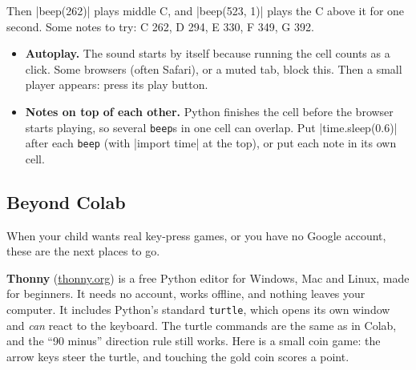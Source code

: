 Then \py|beep(262)| plays middle C, and \py|beep(523, 1)| plays the C above it for one second. Some notes to try: C 262, D 294, E 330, F 349, G 392.

\begin{itemize}
  \item \textbf{Autoplay.} The sound starts by itself because running the cell counts as a click. Some browsers (often Safari), or a muted tab, block this. Then a small player appears: press its play button.
  \item \textbf{Notes on top of each other.} Python finishes the cell before the browser starts playing, so several \texttt{beep}s in one cell can overlap. Put \py|time.sleep(0.6)| after each \texttt{beep} (with \py|import time| at the top), or put each note in its own cell.
\end{itemize}

\subsection*{Beyond Colab}

When your child wants real key-press games, or you have no Google account, these are the next places to go.

\textbf{Thonny} (\url{thonny.org}) is a free Python editor for Windows, Mac and Linux, made for beginners. It needs no account, works offline, and nothing leaves your computer. It includes Python's standard \texttt{turtle}, which opens its own window and \emph{can} react to the keyboard. The turtle commands are the same as in Colab, and the ``90 minus'' direction rule still works. Here is a small coin game: the arrow keys steer the turtle, and touching the gold coin scores a point.

